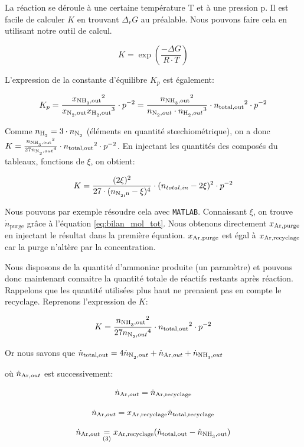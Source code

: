 \documentclass[a4paper, oneside, 12pt]{article}
\begin{document}
La réaction se déroule à une certaine température T et à une pression p. 
Il est facile de calculer $K$ en trouvant $\Delta_r G$ au préalable. 
Nous pouvons faire cela en utilisant notre outil de calcul.

\[
K=\exp{\left(\frac{-\Delta G}{R \cdot T}\right)}\]

L'expression de la constante d'équilibre $K_p$ est également: 

\[
K_p=\frac{{x_{\ce{NH3},\text{out}}}^2}{x_{\ce{N2},\text{out}}{x_{\ce{H2},\text{out}}}^3} \cdot p^{-2} = 
\frac{{n_{\ce{NH3},\text{out}}}^2}{n_{\ce{N2},out}\cdot {n_{\ce{H2},out}}^3}\cdot {n_{\text{total,out}}}^2\cdot p^{-2}
\]

Comme $n_{\ce{H2}}=3\cdot n_{\ce{N2}}$ (éléments en quantité stœchiométrique), 
on a donc 
$K=\frac{{n_{\ce{NH3},\text{out}}}^2}{27{n_{\ce{N2},out}}^4} \cdot
{n_{\text{total,out}}}^2\cdot p^{-2}$. 
En injectant les quantités des composés du tableaux, fonctions de $\xi$, on obtient:

\[ 
K = 
\frac{({2\xi})^2}{27 \cdot ({{n_{\ce{N2,in}}-\xi})^4}} \cdot
({n_{total,in}-2\xi})^2 \cdot p^{-2} 
\]

Nous pouvons par exemple résoudre cela avec \texttt{MATLAB}. 
Connaissant $\xi$, on trouve $\dot{n}_{\text{purge}}$
grâce à l'équation \ref{eq:bilan_mol_tot}. 
Nous obtenons directement $x_{\ce{Ar},\text{purge}}$ en injectant 
le résultat dans la première équation. 
$x_{\ce{Ar},\text{purge}}$ est égal à $x_{\ce{Ar},\text{recyclage}}$ 
car la purge n'altère par la concentration.

Nous disposons de la quantité d'ammoniac produite (un paramètre) 
et pouvons donc maintenant connaitre la quantité totale de réactifs restants après réaction. 
Rappelons que les quantité utilisées plus haut ne prenaient pas en compte le recyclage. 
Reprenons l'expression de $K$: 

\[ 
K = 
\frac{{n_{\ce{NH3},\text{out}}}^2}{27{n_{\ce{N2},out}}^4} \cdot 
{n_{\text{total,out}}}^2\cdot p^{-2}
\]

Or nous savons que $\dot{n}_{\text{total,out}} = 
4\dot{n}_{\ce{N2},out}+\dot{n}_{\ce{Ar},out}+\dot{n}_{\ce{NH3},out}$ 

où $\dot{n}_{\ce{Ar},out}$ est successivement:

\[\dot{n}_{\ce{Ar},out}=\dot{n}_{\ce{Ar},\text{recyclage}}\]

\[ \dot{n}_{\ce{Ar},out}=x_{\ce{Ar},\text{recyclage}}\dot{n}_{\text{total,recyclage}} \]

\[ 
\dot{n}_{\ce{Ar},out}\underset{(3)} = 
x_{\ce{Ar},\text{recyclage}}(\dot{n}_{\text{total,out}}-\dot{n}_{\ce{NH3},\text{out}}) 
\]
\end{document}
